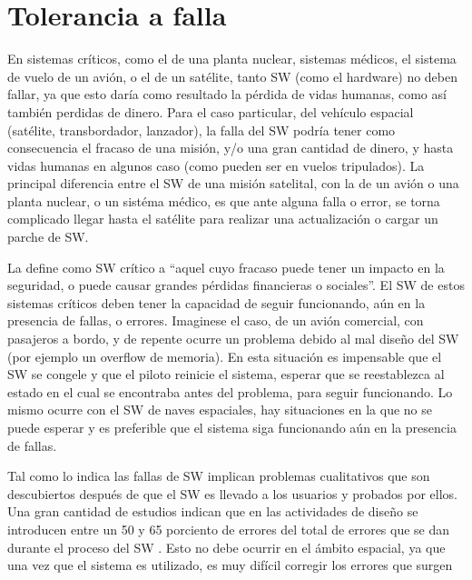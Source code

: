 \section{Tolerancia a falla}\label{chap:FaultTolerance}
En sistemas críticos, como el de una planta nuclear, sistemas médicos, el sistema de vuelo 
de un avión, o el de un satélite, tanto \ac{SW} (como el hardware) no deben fallar, ya que esto daría 
como resultado la pérdida de vidas humanas, como así también perdidas de dinero.
Para el caso particular, del vehículo espacial 
(satélite, transbordador, lanzador), la falla del \ac{SW} podría tener como consecuencia el
fracaso de una misión, y/o una gran cantidad de dinero, y hasta vidas humanas en algunos caso (como pueden ser en vuelos 
tripulados). La principal diferencia entre el \ac{SW} de una misión satelital, con la de un avión 
o una planta nuclear, o un sistéma médico, es que ante alguna falla o error, se torna complicado 
llegar hasta el satélite para realizar una actualización o cargar un parche de \ac{SW}.

La \cite{IEEE610.12} define como \ac{SW} crítico a ``aquel cuyo fracaso puede tener un impacto en 
la seguridad, o puede causar grandes pérdidas financieras o sociales''. El \ac{SW} de estos 
sistemas críticos deben tener la capacidad de seguir funcionando, aún en la presencia de fallas, o 
errores. Imaginese el caso, de un avión comercial, con pasajeros a bordo, y de repente ocurre un 
problema debido al mal diseño del \ac{SW} (por ejemplo un overflow de memoria). En esta situación 
es impensable que el \ac{SW} se congele y que el piloto reinicie el sistema, esperar que se 
reestablezca al estado en el cual se encontraba antes del problema, para seguir funcionando. Lo 
mismo ocurre con el \ac{SW} de naves espaciales, hay situaciones en la que no se puede esperar y es 
preferible que el sistema siga funcionando aún en la presencia de fallas.

Tal como lo indica \cite{pressman01} las fallas de \ac{SW} implican problemas cualitativos que son 
descubiertos después de que el \ac{SW} es llevado a los usuarios y probados por ellos. Una 
gran cantidad de estudios indican que en las actividades de diseño se introducen entre un 50 y 65 
porciento de errores del total de errores que se dan durante el proceso del \ac{SW} 
\citep{pressman01}. Esto no debe ocurrir en el ámbito espacial, ya que una vez que el sistema es 
utilizado, es muy difícil corregir los errores que surgen 

